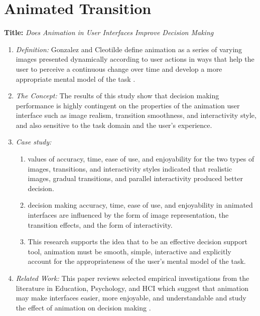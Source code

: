 \documentclass{egpubl}
\begin{document}
\label{fig:ferreira2013}
\endgroup

\section{Animated Transition}
\textbf{Title:} \textit{Does Animation in User Interfaces Improve Decision Making}
\begin{enumerate}
\item \textit{Definition:} Gonzalez and Cleotilde define animation as a series of varying images presented dynamically according to user actions in ways that help the user to perceive a continuous change over time and develop a more appropriate mental model of the task \cite{gonzalez1995animation}.
\item \textit{The Concept:} The results of this study show that decision making performance is highly contingent on the properties of the animation user interface such as image realism, transition smoothness, and interactivity style, and also sensitive to the task domain and the user's experience.  
\item \textit{Case study:}
\begin{enumerate}
\item values of accuracy, time, ease of use, and enjoyability for the two types of images, transitions, and interactivity styles indicated that realistic images, gradual transitions, and parallel interactivity produced better decision.
\item decision making accuracy, time, ease of use, and enjoyability in animated interfaces are influenced by the form of image representation, the transition effects, and the form of interactivity.
\item This research supports the idea that to be an effective decision support tool, animation must be smooth, simple, interactive and explicitly account for the appropriateness of the user's mental model of the task.
\end{enumerate}
\item \textit{Related Work:} This paper reviews selected empirical investigations from the literature in Education, Psychology, and HCI which suggest that animation may make interfaces easier, more enjoyable, and understandable and study the effect of animation on decision making \cite{gonzalez1996does}.
\end{enumerate}
\end{document}
